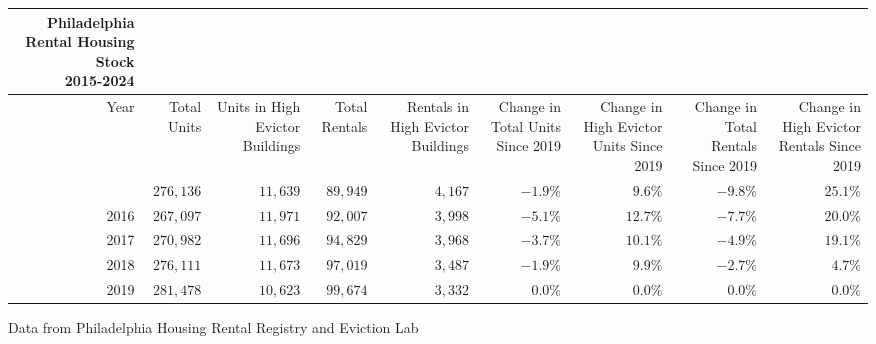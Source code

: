 \setlength{\LTpost}{0mm}
\begin{longtable}{rrrrrrrrr}
\caption*{
{\large Philadelphia Rental Housing Stock} \\ 
{\small 2015-2024}
} \\ 
\toprule
Year & Total Units & Units in High Evictor Buildings & Total Rentals & Rentals in High Evictor Buildings & Change in Total Units Since 2019 & Change in High Evictor Units Since 2019 & Change in Total Rentals Since 2019 & Change in High Evictor Rentals Since 2019 \\ 
\midrule\addlinespace[2.5pt]
2015 & $276,136$ & $11,639$ & $89,949$ & $4,167$ & $-1.9\%$ & $9.6\%$ & $-9.8\%$ & $25.1\%$ \\ 
2016 & $267,097$ & $11,971$ & $92,007$ & $3,998$ & $-5.1\%$ & $12.7\%$ & $-7.7\%$ & $20.0\%$ \\ 
2017 & $270,982$ & $11,696$ & $94,829$ & $3,968$ & $-3.7\%$ & $10.1\%$ & $-4.9\%$ & $19.1\%$ \\ 
2018 & $276,111$ & $11,673$ & $97,019$ & $3,487$ & $-1.9\%$ & $9.9\%$ & $-2.7\%$ & $4.7\%$ \\ 
2019 & $281,478$ & $10,623$ & $99,674$ & $3,332$ & $0.0\%$ & $0.0\%$ & $0.0\%$ & $0.0\%$ \\ 
\bottomrule
\end{longtable}
\begin{minipage}{\linewidth}
Data from Philadelphia Housing Rental Registry and Eviction Lab\\
\end{minipage}

